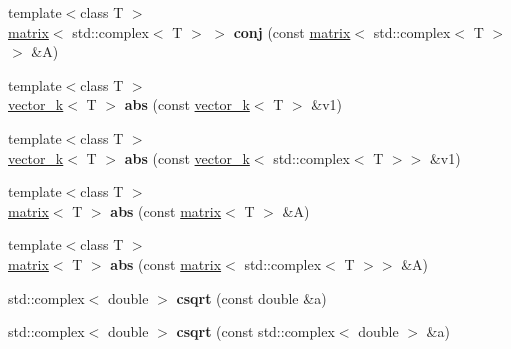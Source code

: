 \begin{DoxyCompactItemize}
\item 
\hypertarget{namespacekeycpp_a0f000b392fbefccdb089383bb6a20151}{{\footnotesize template$<$class T $>$ }\\\hyperlink{classkeycpp_1_1matrix}{matrix}$<$ std\-::complex$<$ T $>$ $>$ {\bfseries conj} (const \hyperlink{classkeycpp_1_1matrix}{matrix}$<$ std\-::complex$<$ T $>$$>$ \&A)}\label{namespacekeycpp_a0f000b392fbefccdb089383bb6a20151}

\item 
\hypertarget{namespacekeycpp_a83cec179e95af014706ce54194efd1b9}{{\footnotesize template$<$class T $>$ }\\\hyperlink{classkeycpp_1_1vector__k}{vector\-\_\-k}$<$ T $>$ {\bfseries abs} (const \hyperlink{classkeycpp_1_1vector__k}{vector\-\_\-k}$<$ T $>$ \&v1)}\label{namespacekeycpp_a83cec179e95af014706ce54194efd1b9}

\item 
\hypertarget{namespacekeycpp_aa48f282087263edb46886e9390b9a833}{{\footnotesize template$<$class T $>$ }\\\hyperlink{classkeycpp_1_1vector__k}{vector\-\_\-k}$<$ T $>$ {\bfseries abs} (const \hyperlink{classkeycpp_1_1vector__k}{vector\-\_\-k}$<$ std\-::complex$<$ T $>$$>$ \&v1)}\label{namespacekeycpp_aa48f282087263edb46886e9390b9a833}

\item 
\hypertarget{namespacekeycpp_a1f83b48bfedf753904dfea9dde554a4c}{{\footnotesize template$<$class T $>$ }\\\hyperlink{classkeycpp_1_1matrix}{matrix}$<$ T $>$ {\bfseries abs} (const \hyperlink{classkeycpp_1_1matrix}{matrix}$<$ T $>$ \&A)}\label{namespacekeycpp_a1f83b48bfedf753904dfea9dde554a4c}

\item 
\hypertarget{namespacekeycpp_ae0edec63f48a81c576da0c0ffc768af9}{{\footnotesize template$<$class T $>$ }\\\hyperlink{classkeycpp_1_1matrix}{matrix}$<$ T $>$ {\bfseries abs} (const \hyperlink{classkeycpp_1_1matrix}{matrix}$<$ std\-::complex$<$ T $>$$>$ \&A)}\label{namespacekeycpp_ae0edec63f48a81c576da0c0ffc768af9}

\item 
\hypertarget{namespacekeycpp_a952e5296774667c3be4e792b5cd980da}{std\-::complex$<$ double $>$ {\bfseries csqrt} (const double \&a)}\label{namespacekeycpp_a952e5296774667c3be4e792b5cd980da}

\item 
\hypertarget{namespacekeycpp_a8faa7912f1f198c5185cb6a36cfd2fb2}{std\-::complex$<$ double $>$ {\bfseries csqrt} (const std\-::complex$<$ double $>$ \&a)}\label{namespacekeycpp_a8faa7912f1f198c5185cb6a36cfd2fb2}


\end{DoxyCompactItemize}
